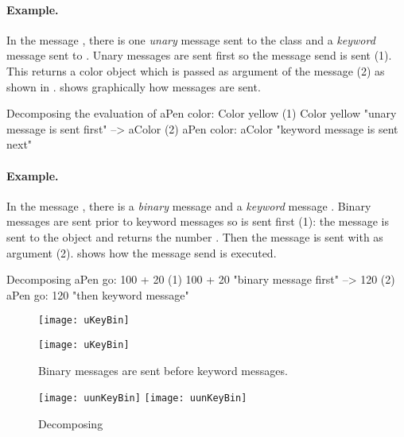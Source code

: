 \documentclass[a4paper,10pt,twoside]{book}
\begin{document}

\paragraph{Example.}
In the message , there is one \emph{unary} message  sent to the class  and a \emph{keyword} message  sent to . Unary messages are sent first so the message send  is sent (1). This returns a color object which is passed as argument of the message  (2) as shown in .
 shows graphically how messages are sent. 

\begin{example}[decColor]{Decomposing the evaluation of }{}
        aPen color: Color yellow
(1)                       Color yellow        "unary message is sent first"
                        --> aColor
(2)   aPen color: aColor                 "keyword message is sent next"
\end{example}

\paragraph{Example.} In the message , there is a \emph{binary} message  and a \emph{keyword} message . Binary messages are sent prior to keyword messages so  is sent first (1): the message  is sent to the object  and returns the number . Then the message  is sent with  as argument (2).
 shows how the message send is executed. 

\begin{example}[decGo]{Decomposing }{}
      aPen go: 100 + 20   
(1)                 100 + 20           "binary message first"
                   -->   120
(2)  aPen go: 120                   "then keyword message"
\end{example}

\begin{figure}[htb]
\begin{minipage}{0.48\textwidth}
	\ifluluelse
		{\centerline{\texttt{[image: uKeyBin]}}}
		{\centerline{\texttt{[image: uKeyBin]}}}
	\caption{Binary messages are sent before keyword messages.\label{fig:uKeyBin}}
\end{minipage}
\hfill
\begin{minipage}{0.48\textwidth}
	\begin{center}
	\ifluluelse
		{\texttt{[image: uunKeyBin]}}
		{\texttt{[image: uunKeyBin]}}
\caption{Decomposing }\label{fig:unKeyBin}
\end{center}
\end{minipage}
\end{figure}
\end{document}
